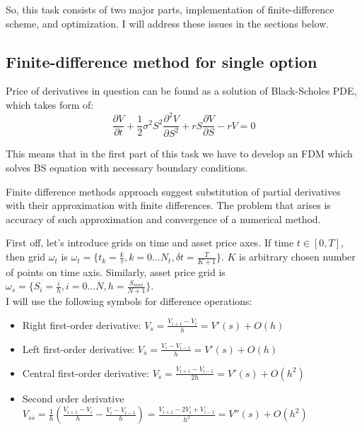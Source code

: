 \documentclass[11pt]{article} %
\begin{document}
So, this task consists of two major parts, implementation of finite-difference scheme, and optimization. I will address these issues in the sections below.

\subsection{Finite-difference method for single option}
Price of derivatives in question can be found as a solution of Black-Scholes PDE, which takes form of:
\begin{equation}
\frac{\partial V}{\partial t} + \frac{1}{2}\sigma^2 S^2 \frac{\partial^2 V}{\partial S^2} +rS\frac{\partial V}{\partial S} - rV = 0
\end{equation}

This means that in the first part of this task we have to develop an FDM which solves BS equation with necessary boundary conditions. 

Finite difference methods approach suggest substitution of partial derivatives with their approximation with finite differences. The problem that arises is accuracy of such approximation and convergence of a numerical method.

First off, let's introduce grids on time and asset price axes. If time $t \in [0,T]$, then grid $\omega_t$ is $\omega_t = \lbrace t_k =\frac{k}{\tau}, k = 0...N_t, \delta t = \frac{T}{K+1}\rbrace$. $K$ is arbitrary chosen number of points on time axis. Similarly, asset price grid is $\omega_s = \lbrace S_i = \frac{i}{h}, i = 0...N, h = \frac{S_{max}}{N+1}\rbrace$.\\

I will use the following symbols for difference operations:
\begin{itemize}
	\item Right first-order derivative: $V_s =\frac{V_{i+1}-V_i}{h} = V'(s) + O(h)$
	\item Left first-order derivative: $V_{\overline{s}} =\frac{V_{i}-V_{i-1}}{h} = V'(s) + O(h)$
	\item Central first-order derivative: $V_{\mathring{s}} =\frac{V_{i+1}-V_{i-1}}{2h} = V'(s) + O(h^2)$
	\item Second order derivative $V_{s\overline{s}} = \frac{1}{h}\left(\frac{V_{i+1}-V_i}{h} - \frac{V_{i}-V_{i-1}}{h}\right) = \frac{V_{i+1}-2V_{i}+V_{i-1}}{h^2} = V''(s) + O(h^2)$
\end{itemize}
\end{document}
